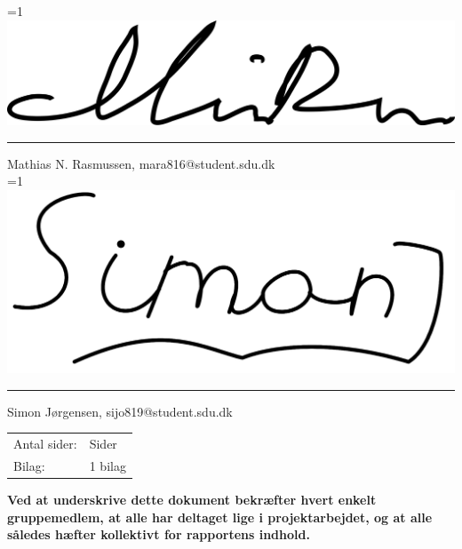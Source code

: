 \noindent
\ifnum \value{PROD}=1
    \includegraphics[scale=0.120]{figures/signatures/Signatur_mara816.png}
    \vspace{-5mm}
\fi
\par\noindent\rule{\textwidth}{0.4pt}
\noindent
Mathias N. Rasmussen, mara816@student.sdu.dk\\

\noindent
\ifnum\value{PROD}=1
    \includegraphics[scale=0.042]{figures/signatures/signatureSJ.png}
    \vspace{-3.5mm}
\fi
\par\noindent\rule{\textwidth}{0.4pt}
\noindent
Simon Jørgensen, sijo819@student.sdu.dk\\



\noindent
\begin{tabular}{@{}l l}
Antal sider:    & \pageref{LastPage} Sider \\
Bilag:          & 1 bilag 
\end{tabular}

\vspace{3.5mm}

\begin{footnotesize}
\noindent
\textbf{Ved at underskrive dette dokument bekræfter hvert enkelt gruppemedlem, at alle
har deltaget lige i projektarbejdet, og at alle således hæfter kollektivt for rapportens indhold.}
\end{footnotesize}